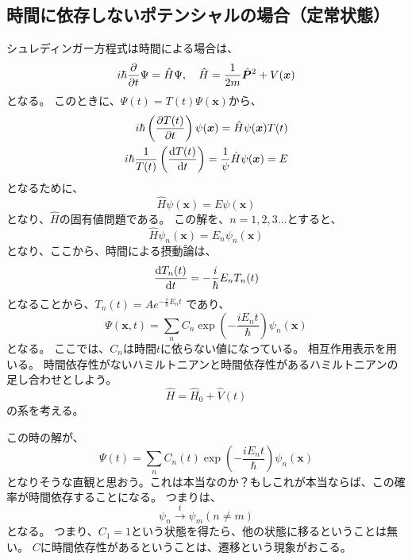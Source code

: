 \documentclass[titlepage]{ltjsarticle}
\begin{document}
\subsection{時間に依存しないポテンシャルの場合（定常状態）}
シュレディンガー方程式は時間による場合は、
\begin{equation}
  i \hbar \pdv{}{t} \Psi = \hat{H} \Psi , \quad \hat{H} = \frac{1}{2m} \hat{\bm{P}}^2 + V(\bm{x})
\end{equation}
となる。
このときに、\(\Psi(t)=T(t)\Psi(\bm{x})\)から、
\begin{align}
  i \hbar \left( \pdv{T(t)}{t} \right) \psi(\bm{x}) = \hat{H} \psi(\bm{x}) T(t)\\
  i \hbar \frac{1}{T(t)} \left( \odv{T(t)}{t} \right) = \frac{1}{\psi} \hat{H} \psi(\bm{x}) = E
\end{align}
となるために、
\begin{equation}
  \hat{H} \psi(\bm{x}) = E \psi(\bm{x})
\end{equation}
となり、\(\hat{H}\)の固有値問題である。
この解を、\(n=1,2,3\ldots\)とすると、
\begin{equation}
  \hat{H} \psi_n(\bm{x}) = E_n \psi_n(\bm{x})
\end{equation}
となり、ここから、時間による摂動論は、
\begin{equation}
  \odv{T_n(t)}{t} = - \frac{i}{\hbar} E_n T_n(t)
\end{equation}
となることから、\(T_n(t) = A e^{-\frac{i}{\hbar}E_n t}\)
であり、
\begin{equation}
  \Psi(\bm{x},t) = \sum_n C_n \exp \left( -\frac{i E_n t}{\hbar} \right) \psi_n(\bm{x})
\end{equation}
となる。
ここでは、\(C_n\)は時間\(t\)に依らない値になっている。
相互作用表示を用いる。
時間依存性がないハミルトニアンと時間依存性があるハミルトニアンの足し合わせとしよう。
\begin{equation}
  \hat{H} = \hat{H}_0 + \hat{V}(t)
\end{equation}
の系を考える。

この時の解が、
\begin{equation}
\Psi(t) = \sum_n C_n(t) \exp \left( -\frac{i E_n t}{\hbar} \right) \psi_n(\bm{x})
\end{equation}
となりそうな直観と思おう。これは本当なのか？もしこれが本当ならば、この確率が時間依存することになる。
つまりは、
\begin{equation}
  \psi_n \xrightarrow{t} \psi_m (n\ne m)
\end{equation}
となる。
つまり、\(C_1=1\)という状態を得たら、他の状態に移るということは無い。
\(C\)に時間依存性があるということは、遷移という現象がおこる。
\end{document}
